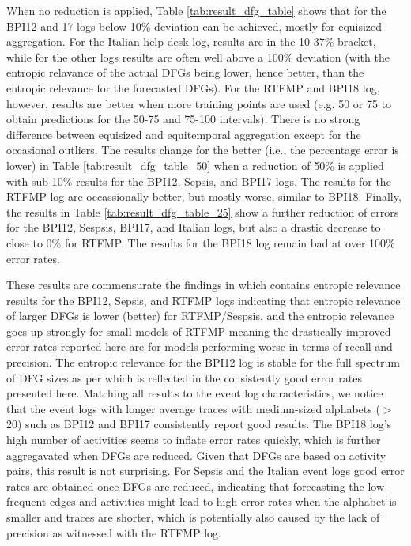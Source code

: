 When no reduction is applied, Table \ref{tab:result_dfg_table} shows that for the BPI12 and 17 logs below 10\% deviation can be achieved, mostly for equisized aggregation. 
For the Italian help desk log, results are in the 10-37\% bracket, while for the other logs results are often well above a 100\% deviation (with the entropic relavance of the actual DFGs being lower, hence better, than the entropic relevance for the forecasted DFGs).
For the RTFMP and BPI18 log, however, results are better when more training points are used (e.g. 50 or 75 to obtain predictions for the 50-75 and 75-100 intervals).
There is no strong difference between equisized and equitemporal aggregation except for the occasional outliers.
The results change for the better (i.e., the percentage error is lower) in Table \ref{tab:result_dfg_table_50} when a reduction of 50\% is applied with sub-10\% results for the BPI12, Sepsis, and BPI17 logs. 
The results for the RTFMP log are occassionally better, but mostly worse, similar to BPI18.
Finally, the results in Table \ref{tab:result_dfg_table_25} show a further reduction of errors for the BPI12, Sespsis, BPI17, and Italian logs, but also a drastic decrease to close to 0\% for RTFMP.
The results for the BPI18 log remain bad at over 100\% error rates.

These results are commensurate the findings in \cite{DBLP:conf/icpm/PolyvyanyyMG20} which contains entropic relevance results for the BPI12, Sepsis, and RTFMP logs indicating that entropic relevance of larger DFGs is lower (better) for RTFMP/Sespsis, and the entropic relevance goes up strongly for small models of RTFMP meaning the drastically improved error rates reported here are for models performing worse in terms of recall and precision.
The entropic relevance for the BPI12 log is stable for the full spectrum of DFG sizes as per \cite{DBLP:conf/icpm/PolyvyanyyMG20} which is reflected in the consistently good error rates presented here.
Matching all results to the event log characteristics, we notice that the event logs with longer average traces with medium-sized alphabets ($>$20) such as BPI12 and BPI17 consistently report good results.
The BPI18 log's high number of activities seems to inflate error rates quickly, which is further aggregavated when DFGs are reduced.
Given that DFGs are based on activity pairs, this result is not surprising.
For Sepsis and the Italian event logs good error rates are obtained once DFGs are reduced, indicating that forecasting the low-frequent edges and activities might lead to high error rates when the alphabet is smaller and traces are shorter, which is potentially also caused by the lack of precision as witnessed with the RTFMP log.

